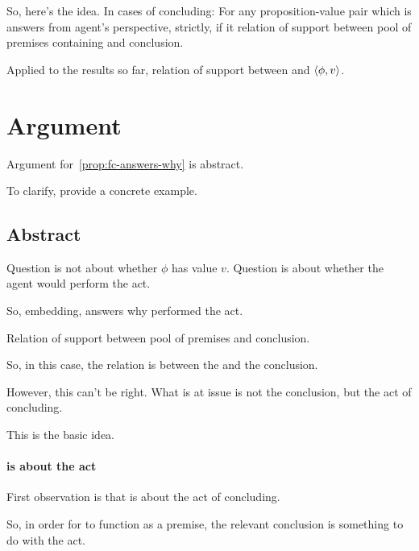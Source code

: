 \begin{note}
  So, here's the idea.
  In cases of concluding:
  For any proposition-value pair which is answers from agent's perspective, strictly,
  if it relation of support between pool of premises containing and conclusion.
\end{note}

\begin{note}
  Applied to the results so far, relation of support between \fc{} and \(\langle \phi, v \rangle\).
\end{note}

\section{Argument}
\label{cha:zSpAwhy:sec:argument}

\begin{note}
  Argument for~\autoref{prop:fc-answers-why} is abstract.

  To clarify, provide a concrete example.
\end{note}

\subsection{Abstract}
\label{cha:zSpAwhy:sec:argument:abstract}

\begin{note}
  \color{red}
  Question is not about whether \(\phi\) has value \(v\).
  Question is about whether the agent would perform the act.

  So, embedding, answers why performed the act.

  Relation of support between pool of premises and conclusion.

  So, in this case, the relation is between the \fc{} and the conclusion.

  However, this can't be right.
  What is at issue is not the conclusion, but the act of concluding.

  This is the basic idea.
\end{note}

\paragraph{\qzS{} is about the act}

\begin{note}
  First observation is that \qzS{} is about the act of concluding.

  So, in order for \fc{} to function as a premise, the relevant conclusion is something to do with the act.
\end{note}

